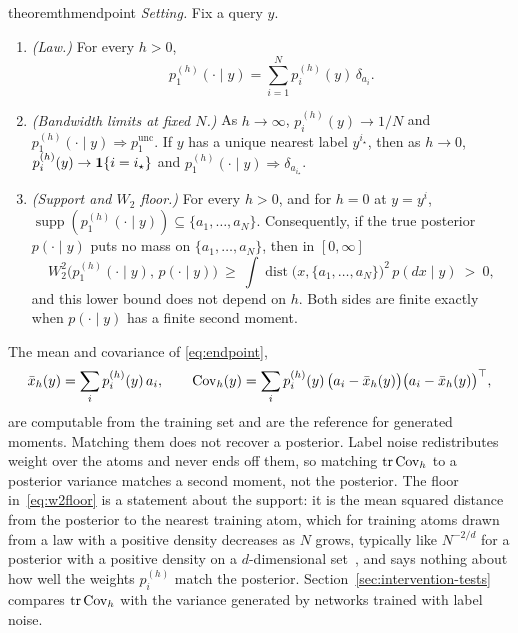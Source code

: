 \documentclass{article} %
\newif\ificlr
\theoremstyle{plain}
\theoremstyle{definition}
\theoremstyle{remark}
\begin{document}
\begin{restatable}{theorem}{thmendpoint}
\label{thm:endpoint}
\emph{Setting.} Fix a query $y$.
\begin{enumerate}[label=(\alph*),leftmargin=2em]
\item \emph{(Law.)} For every $h>0$,
  \begin{equation}
  p_1^{(h)}(\cdot\mid y)=\sum_{i=1}^N p_i^{(h)}(y)\,\delta_{a_i}.
  \label{eq:endpoint}
  \end{equation}
\item \emph{(Bandwidth limits at fixed $N$.)} As $h\to\infty$, $p_i^{(h)}(y)\to1/N$ and
  $p_1^{(h)}(\cdot\mid y)\Rightarrow p_1^{\mathrm{unc}}$. If $y$ has a unique nearest label
  $y^{i_\star}$, then as $h\to0$, $p_i^{(h)}(y)\to\mathbf{1}\{i=i_\star\}$ and
  $p_1^{(h)}(\cdot\mid y)\Rightarrow\delta_{a_{i_\star}}$.
\item \emph{(Support and $W_2$ floor.)} For every $h>0$, and for $h=0$ at $y=y^i$,
  $\operatorname{supp}(p_1^{(h)}(\cdot\mid y))\subseteq\{a_1,\dots,a_N\}$. Consequently, if the
  true posterior $p(\cdot\mid y)$ puts no mass on $\{a_1,\dots,a_N\}$, then in $[0,\infty]$
  \begin{equation}
  W_2^2\big(p_1^{(h)}(\cdot\mid y),\,p(\cdot\mid y)\big)\ \ge\
  \int\operatorname{dist}\big(x,\{a_1,\dots,a_N\}\big)^2\,p(dx\mid y)\ >\ 0,
  \label{eq:w2floor}
  \end{equation}
  and this lower bound does not depend on $h$. Both sides are finite exactly when
  $p(\cdot\mid y)$ has a finite second moment.
\end{enumerate}
\end{restatable}
The mean and covariance of \eqref{eq:endpoint},
\begin{equation}
\bar x_h(y)=\sum_ip_i^{(h)}(y)\,a_i,\qquad
\operatorname{Cov}_h(y)=\sum_ip_i^{(h)}(y)\,\bigl(a_i-\bar x_h(y)\bigr)\bigl(a_i-\bar x_h(y)\bigr)^\top,
\label{eq:covh}
\end{equation}
are computable from the training set and are the reference for generated moments. Matching them
does not recover a posterior.
Label noise redistributes weight over the atoms and never ends off them, so
matching $\operatorname{tr}\operatorname{Cov}_h$ to a posterior variance matches a second moment, not the posterior.\ificlr\else{}
The floor in~\eqref{eq:w2floor} is a statement about the support: it is the mean squared distance
from the posterior to the nearest training atom, which for training atoms drawn from a law with a
positive density decreases as $N$ grows, typically like $N^{-2/d}$ for a posterior with a positive
density on a $d$-dimensional set~\citep{graf2000quantization}, and says nothing about how well
the weights $p_i^{(h)}$ match the posterior.\fi{} Section~\ref{sec:intervention-tests} compares
$\operatorname{tr}\operatorname{Cov}_h$ with the variance generated by networks trained with label noise.
\end{document}
